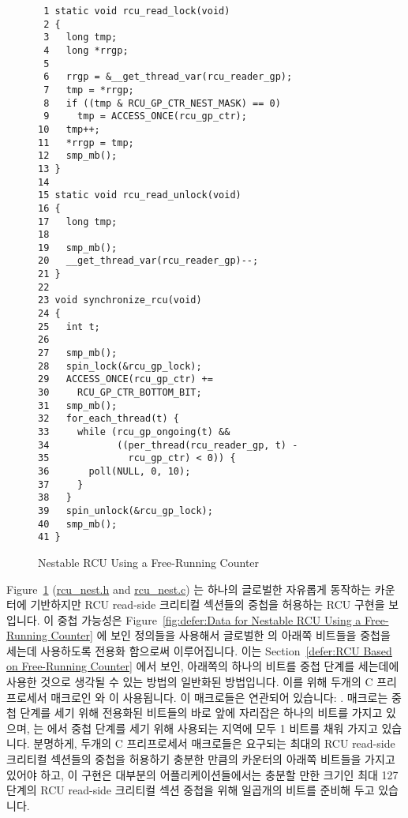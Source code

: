 \begin{figure}[tbp]
{ \scriptsize
\begin{verbatim}
 1 static void rcu_read_lock(void)
 2 {
 3   long tmp;
 4   long *rrgp;
 5 
 6   rrgp = &__get_thread_var(rcu_reader_gp);
 7   tmp = *rrgp;
 8   if ((tmp & RCU_GP_CTR_NEST_MASK) == 0)
 9     tmp = ACCESS_ONCE(rcu_gp_ctr);
10   tmp++;
11   *rrgp = tmp;
12   smp_mb();
13 }
14 
15 static void rcu_read_unlock(void)
16 {
17   long tmp;
18 
19   smp_mb();
20   __get_thread_var(rcu_reader_gp)--;
21 }
22 
23 void synchronize_rcu(void)
24 {
25   int t;
26 
27   smp_mb();
28   spin_lock(&rcu_gp_lock);
29   ACCESS_ONCE(rcu_gp_ctr) +=
30     RCU_GP_CTR_BOTTOM_BIT;
31   smp_mb();
32   for_each_thread(t) {
33     while (rcu_gp_ongoing(t) &&
34            ((per_thread(rcu_reader_gp, t) -
35              rcu_gp_ctr) < 0)) {
36       poll(NULL, 0, 10);
37     }
38   }
39   spin_unlock(&rcu_gp_lock);
40   smp_mb();
41 }
\end{verbatim}
}
\caption{Nestable RCU Using a Free-Running Counter}
\label{fig:defer:Nestable RCU Using a Free-Running Counter}
\end{figure}

Figure~\ref{fig:defer:Nestable RCU Using a Free-Running Counter}
(\url{rcu_nest.h} and \url{rcu_nest.c})
는 하나의 글로벌한 자유롭게 동작하는 카운터에 기반하지만 RCU read-side 크리티컬
섹션들의 중첩을 허용하는 RCU 구현을 보입니다.
이 중첩 가능성은
Figure~\ref{fig:defer:Data for Nestable RCU Using a Free-Running Counter} 에
보인 정의들을 사용해서 글로벌한  의 아래쪽 비트들을 중첩을
세는데 사용하도록 전용화 함으로써 이루어집니다.
이는
Section~\ref{defer:RCU Based on Free-Running Counter} 에서 보인, 아래쪽의
하나의 비트를 중첩 단계를 세는데에 사용한 것으로 생각될 수 있는 방법의 일반화된
방법입니다.
이를 위해 두개의 C 프리프로세서 매크로인  와
 이 사용됩니다.
이 매크로들은 연관되어 있습니다:
.
 매크로는 중첩 단계를 세기 위해 전용화된 비트들의
바로 앞에 자리잡은 하나의 비트를 가지고 있으며,  는
 에서 중첩 단계를 세기 위해 사용되는 지역에 모두 1 비트를 채워
가지고 있습니다.
분명하게, 두개의 C 프리프로세서 매크로들은 요구되는 최대의 RCU read-side
크리티컬 섹션들의 중첩을 허용하기 충분한 만큼의 카운터의 아래쪽 비트들을 가지고
있어야 하고, 이 구현은 대부분의 어플리케이션들에서는 충분할 만한 크기인 최대
127 단계의 RCU read-side 크리티컬 섹션 중첩을 위해 일곱개의 비트를 준비해 두고
있습니다.
\iffalse

